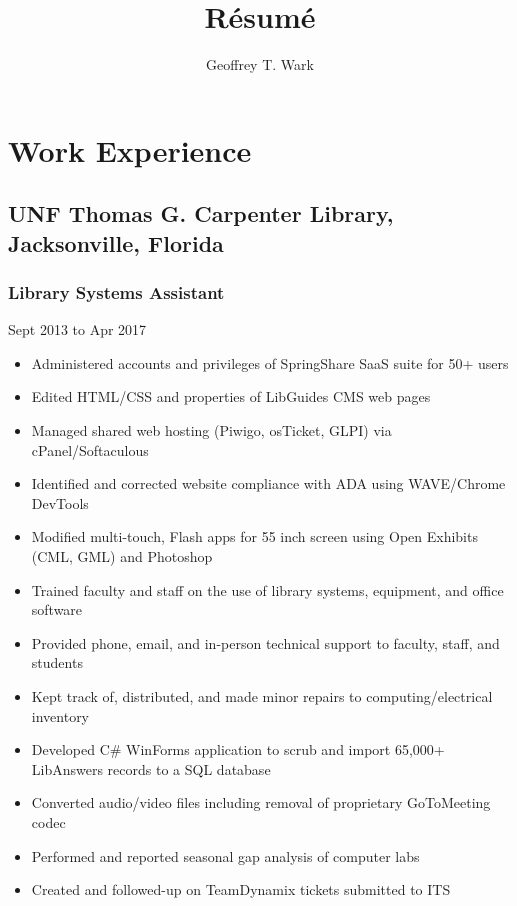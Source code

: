 \documentclass{article}
\begin{document}
\title{R\'esum\'e}
\author{Geoffrey T. Wark}

\maketitle


\section{Work Experience}
\subsection{UNF Thomas G. Carpenter Library, Jacksonville, Florida}
\subsubsection{Library Systems Assistant}
Sept 2013 to Apr 2017

\begin{itemize}
\item Administered accounts and privileges of SpringShare SaaS suite for 50+ users
\item Edited HTML/CSS and properties of LibGuides CMS web pages
\item Managed shared web hosting (Piwigo, osTicket, GLPI) via cPanel/Softaculous
\item Identified and corrected website compliance with ADA using WAVE/Chrome DevTools
\item Modified multi-touch, Flash apps for 55 inch screen using Open Exhibits (CML, GML) and Photoshop
\item Trained faculty and staff on the use of library systems, equipment, and office software
\item Provided phone, email, and in-person technical support to faculty, staff, and students
\item Kept track of, distributed, and made minor repairs to computing/electrical inventory
\item Developed C\# WinForms application to scrub and import 65,000+ LibAnswers records to a SQL database
\item Converted audio/video files including removal of proprietary GoToMeeting codec
\item Performed and reported seasonal gap analysis of computer labs
\item Created and followed-up on TeamDynamix tickets submitted to ITS
\end{itemize}
\end{document}
